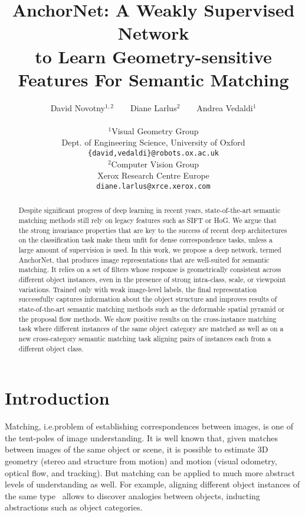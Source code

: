 \documentclass[10pt,twocolumn,letterpaper]{article}
\title{AnchorNet: A Weakly Supervised Network \\ to Learn Geometry-sensitive Features For Semantic Matching}
\author{
David Novotny$^{1,2}$ ~ ~ Diane Larlus$^2$ ~ ~ Andrea Vedaldi$^1$ \\
\begin{minipage}{.5\textwidth}
\centering
$^1$\small{Visual Geometry Group\\Dept. of Engineering Science, University of Oxford\\}
{\tt\small \{david,vedaldi\}@robots.ox.ac.uk}
\end{minipage} 
\begin{minipage}{.5\textwidth}
\centering
$^2$\small{Computer Vision Group\\Xerox Research Centre Europe\\} 
{\tt\small diane.larlus@xrce.xerox.com}
\end{minipage}
}
\begin{document}
\maketitle
\begin{abstract} 
Despite significant progress of deep learning in recent years, 
state-of-the-art semantic matching methods still rely on legacy features such as SIFT or HoG. We argue that the strong invariance properties that are key to the success of recent deep architectures on the classification task make them unfit for dense correspondence tasks, unless a large amount of supervision is used. In this work, we propose a deep network, termed AnchorNet, that produces image representations that are well-suited for semantic matching. It relies on a set of filters whose response is geometrically consistent across different object instances, even in the presence of strong intra-class, scale, or viewpoint variations. Trained only with weak image-level labels, the final representation successfully captures information about the object structure and improves results of state-of-the-art semantic matching methods such as the deformable spatial pyramid or the proposal flow methods.
We show positive results on the cross-instance matching task where different instances of the same object category are matched as well as
on a new cross-category semantic matching task aligning pairs of instances each from a different object class.
\end{abstract}

\section{Introduction}\label{sec:intro}

Matching, i.e.\the problem of establishing correspondences between images, is one of the tent-poles of image understanding. It is well known that, given matches between images of the same object or scene, it is possible to estimate 3D geometry (stereo and structure from motion) and motion (visual odometry, optical flow, and tracking).
But matching can be applied to much more abstract levels of understanding as well. For example, aligning different object instances of the same type~\cite{kim2013deformable,ham2016} allows to discover analogies between objects, inducting abstractions such as object categories.
\end{document}
